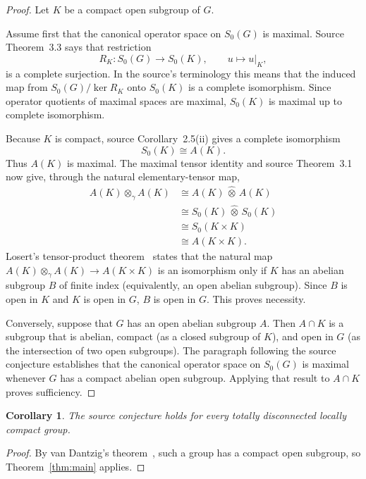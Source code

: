 \documentclass[11pt]{article}
\newtheorem{corollary}[theorem]{Corollary}
\newcommand{\Szero}{S_0}
\begin{document}
\begin{proof}
Let $K$ be a compact open subgroup of $G$.

Assume first that the canonical operator space on $\Szero(G)$ is maximal.
Source Theorem~3.3 says that restriction
\[
 R_K:\Szero(G)\longrightarrow\Szero(K),\qquad u\longmapsto u|_K,
\]
is a complete surjection.  In the source's terminology this means that the
induced map from $\Szero(G)/\ker R_K$ onto $\Szero(K)$ is a complete
isomorphism.  Since operator quotients of maximal spaces are maximal,
$\Szero(K)$ is maximal up to complete isomorphism.

Because $K$ is compact, source Corollary~2.5(ii) gives a complete
isomorphism
\[
 \Szero(K)\cong A(K).
\]
Thus $A(K)$ is maximal.  The maximal tensor identity and source
Theorem~3.1 now give, through the natural elementary-tensor map,
\begin{align*}
 A(K)\otimes_\gamma A(K)
 &\cong A(K)\,\widehat\otimes\,A(K)\\
 &\cong \Szero(K)\,\widehat\otimes\,\Szero(K)\\
 &\cong \Szero(K\times K)\\
 &\cong A(K\times K).
\end{align*}
Losert's tensor-product theorem~\cite{Losert} states that the natural map
$A(K)\otimes_\gamma A(K)\to A(K\times K)$ is an isomorphism only if $K$
has an abelian subgroup $B$ of finite index (equivalently, an open abelian
subgroup).  Since $B$ is open in $K$ and $K$ is open in $G$, $B$ is open in
$G$.  This proves necessity.

Conversely, suppose that $G$ has an open abelian subgroup $A$.  Then
$A\cap K$ is a subgroup that is abelian, compact (as a closed subgroup of
$K$), and open in $G$ (as the intersection of two open subgroups).  The
paragraph following the source conjecture establishes that the canonical
operator space on $\Szero(G)$ is maximal whenever $G$ has a compact abelian
open subgroup.  Applying that result to $A\cap K$ proves sufficiency.
\end{proof}

\begin{corollary}\label{cor:tdlc}
The source conjecture holds for every totally disconnected locally compact
group.
\end{corollary}

\begin{proof}
By van Dantzig's theorem~\cite{vanDantzig}, such a group has a compact open
subgroup, so Theorem~\ref{thm:main} applies.
\end{proof}
\end{document}
